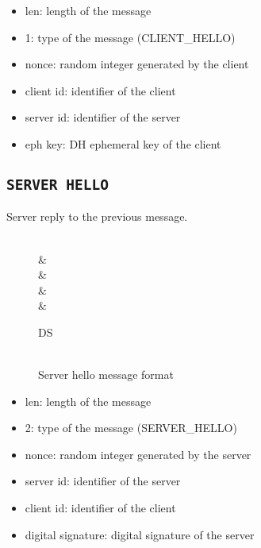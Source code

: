\begin{itemize}
	\item len: length of the message
	\item 1: type of the message (CLIENT\_HELLO)
	\item nonce: random integer generated by the client
	\item client id: identifier of the client
	\item server id: identifier of the server
	\item eph key: DH ephemeral key of the client
\end{itemize}

\subsection{\texttt{SERVER HELLO}}
Server reply to the previous message.
\begin{figure}[h]
	\centering
	\begin{bytefield}[bitwidth=1.1em]{32}
		 \\
		&  \\
		&  \\
		&  \\
		&  \\
		\begin{rightwordgroup}{DS}
			 \\
			 \\
		\end{rightwordgroup}
	\end{bytefield}
	\caption{Server hello message format}
\end{figure}

\begin{itemize}
	\item len: length of the message
	\item 2: type of the message (SERVER\_HELLO)
	\item nonce: random integer generated by the server
	\item server id: identifier of the server
	\item client id: identifier of the client
	\item digital signature: digital signature of the server
\end{itemize}

